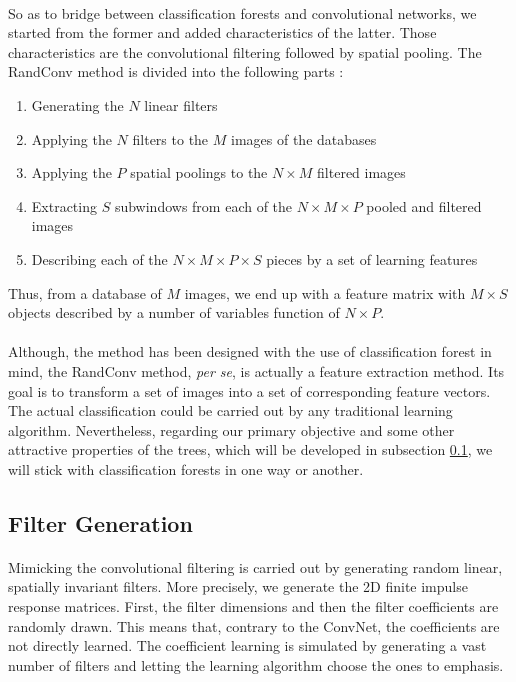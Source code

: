 \documentclass[a4paper]{report}
\begin{document}
	\paragraph{}
	So as to bridge between classification forests and convolutional networks, we started from the former and added characteristics of the latter. Those characteristics are the convolutional filtering followed by spatial pooling.
	The RandConv method is divided into the following parts :
	
	\begin{enumerate}
		\item Generating the $N$ linear filters
		\item Applying the $N$ filters to the $M$ images of the databases
		\item Applying the $P$ spatial poolings to the $N \times M$ filtered images
		\item Extracting $S$ subwindows from each of the $N \times M \times P$ pooled and filtered images
		\item Describing each of the $N \times M \times P \times S$ pieces by a set of learning features
	\end{enumerate}
	
	Thus, from a database of $M$ images, we end up with a feature matrix with $M \times S$ objects described by a number of variables
	function of $N \times P$.
	
	\paragraph{}
	Although, the method has been designed with the use of classification forest in mind, the RandConv method, \textit{per se}, is actually a feature extraction method. Its goal is to transform a set of images into a set of corresponding feature vectors. The actual classification could be carried out by any traditional learning algorithm. Nevertheless, regarding our primary objective and some other attractive properties of the trees, which will be developed in subsection \ref{subsec:methodo-filtergen}, we will stick with classification forests in one way or another.


	
		\subsection{Filter Generation}\label{subsec:methodo-filtergen}
		\paragraph{}
		Mimicking the convolutional filtering is carried out by generating random linear, spatially invariant filters. More precisely, we generate the 2D finite impulse response matrices. First, the filter dimensions and then the filter coefficients are randomly drawn. This means that, contrary to the ConvNet, the coefficients are not directly learned. The coefficient learning is simulated by generating a vast number of filters and letting the learning algorithm choose the ones to emphasis. 
\end{document}

